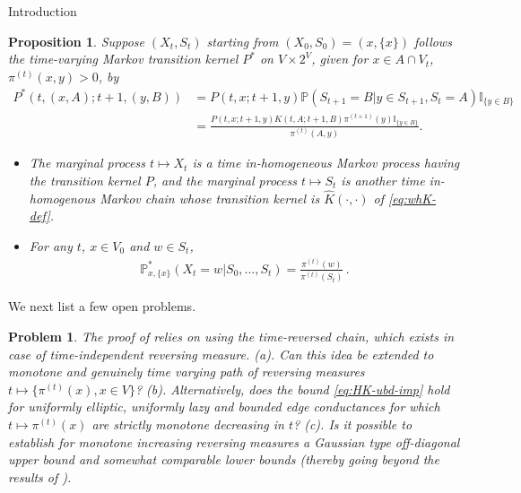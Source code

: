 \documentclass[12pt,reqno]{amsart}
\numberwithin{equation}{section}
\newtheorem{ppn}[thm]{Proposition}
\newtheorem{pbm}[thm]{Problem}
\theoremstyle{definition}
\begin{document}
\begin{section}{Introduction}
\begin{ppn}\label{prop-df}
Suppose $(X_t,S_t)$ starting from $(X_0,S_0)=(x,\{x\})$ follows the  
time-varying Markov transition kernel $P^*$ on $V \times 2^{V}$, 
given for $x \in A \cap V_t$, $\pi^{(t)}(x,y) >0$, by
\begin{align*}
P^*(t,(x,A);t+1,(y,B))&=P(t,x;t+1,y)\mathbb{P}(S_{t+1}=B|y\in S_{t+1},S_t=A)\mathbb{I}_{\{y\in B\}}\\
&=\frac{P(t,x;t+1,y)K(t,A;t+1,B)\pi^{(t+1)}(y)\mathbb{I}_{\{y\in B\}}}{\pi^{(t)}(A,y)}.
\end{align*}
\begin{itemize}
\item[(a)]
The marginal process $t \mapsto X_t$ is a time in-homogeneous Markov 
process having the transition kernel $P$, and the marginal process
$t \mapsto S_t$ is another time in-homogenous Markov chain whose 
transition kernel is $\widehat{K}(\cdot,\cdot)$ of \eqref{eq:whK-def}.
\item[(b)] For any $t$, $x \in V_0$ and $w\in S_t$,  
\begin{align*}
\mathbb{P}^*_{x,\{x\}}(X_t=w|S_0,...,S_t)=\frac{\pi^{(t)}(w)}{\pi^{(t)}(S_t)}\,.
\end{align*}
\end{itemize}
\end{ppn}

We next list a few open problems.
\begin{pbm} The proof of 
\cite[Theorem 7.1]{CGZ} relies on using the time-reversed chain,
which exists in case of time-independent reversing measure. 
\newline
(a). Can this idea be extended to monotone and 
genuinely time varying path of reversing measures $t \mapsto \{\pi^{(t)}(x), x \in V\}$?
\newline
(b). Alternatively, does the bound \eqref{eq:HK-ubd-imp} hold 
for uniformly elliptic, uniformly lazy and bounded
edge conductances for which $t \mapsto \pi^{(t)}(x)$ are strictly 
monotone decreasing in $t$?
\newline
(c). Is it possible to establish for monotone increasing reversing measures 
a Gaussian type off-diagonal upper bound and 
somewhat comparable lower bounds (thereby going beyond the results of 
\cite[Theorem 7.1]{CGZ}).
\end{pbm}


\end{section}
\end{document}
